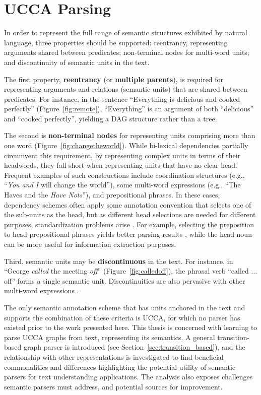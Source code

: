 \documentclass[12pt,a4paper,table]{report}
\begin{document}
\section{UCCA Parsing}\label{sec:intro_ucca_parsing}

In order to represent the full range of semantic structures exhibited by
natural language, three properties should be supported: reentrancy,
representing arguments shared between predicates;
non-terminal nodes for multi-word units;
and discontinuity of semantic units in the text.

The first property, \textbf{reentrancy} (or \textbf{multiple parents}), is required for
representing arguments and relations (semantic units) that are shared between predicates.
For instance, in the sentence
``Everything is delicious and cooked perfectly'' (Figure~\ref{fig:remote}),
``Everything'' is an argument of both ``delicious''
and ``cooked perfectly'', yielding a DAG structure rather than a tree.

The second is \textbf{non-terminal nodes} for representing units
comprising more than one word (Figure~\ref{fig:changetheworld}).
While bi-lexical dependencies partially circumvent this requirement, by
representing complex units in terms of their headwords, they fall short
when representing units that have no clear head.
Frequent examples of such constructions include
coordination structures (e.g., ``\textit{You and I} will change the world''),
some multi-word expressions (e.g., ``The Haves and the \textit{Have Nots}''),
and prepositional phrases.
In these cases, dependency schemes often apply some annotation convention that
selects one of the sub-units
as the head, but as different head selections are needed for different purposes,
standardization problems arise \citep{Ivanova2012who}.
For example, selecting the preposition to head prepositional phrases yields better
parsing results \citep{Schwartz:12}, while the head noun can be more useful for
information extraction purposes.

Third, semantic units may be \textbf{discontinuous} in the text. For instance, in
``George \textit{called} the meeting \textit{off}'' (Figure~\ref{fig:calledoff}),
the phrasal verb ``called ... off'' forms a single semantic unit.
Discontinuities are also pervasive with other multi-word
expressions \citep{schneider2014discriminative}.

The only semantic annotation scheme that has units anchored in the text and supports the combination of these criteria is UCCA,
for which no parser has existed prior to the work presented here.
This thesis is concerned with learning to parse UCCA graphs from text, representing its semantics.
A general transition-based graph parser is introduced (see Section~\ref{sec:transition_based}),
and the relationship with other representations is investigated to find beneficial commonalities and
differences highlighting the potential utility of semantic parsers for text understanding applications.
The analysis also exposes challenges semantic parsers must address,
and potential sources for improvement.
\end{document}
